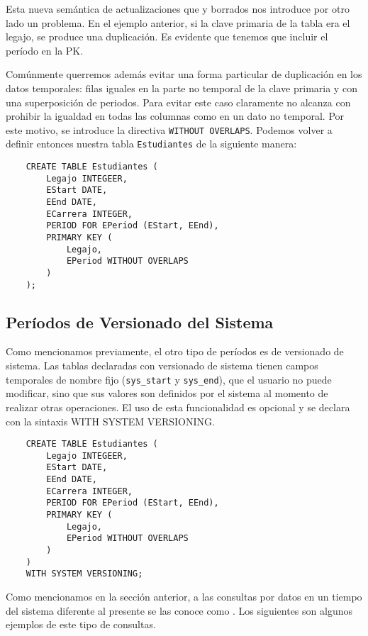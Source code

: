 Esta nueva semántica de actualizaciones que y borrados nos introduce por otro lado un problema.
En el ejemplo anterior, si la clave primaria de la tabla era el legajo, se produce una duplicación.
Es evidente que tenemos que incluir el período en la PK.

Comúnmente querremos además evitar una forma particular de duplicación en los datos temporales:
filas iguales en la parte no temporal de la clave primaria y con una superposición de periodos.
Para evitar este caso claramente no alcanza con prohibir la igualdad en todas las columnas como en un dato no temporal.
Por este motivo, se introduce la directiva \texttt{WITHOUT OVERLAPS}.
Podemos volver a definir entonces nuestra tabla \texttt{Estudiantes} de la siguiente manera:

\begin{verbatim}
    CREATE TABLE Estudiantes (
        Legajo INTEGEER,
        EStart DATE,
        EEnd DATE,
        ECarrera INTEGER,
        PERIOD FOR EPeriod (EStart, EEnd),
        PRIMARY KEY (
            Legajo,
            EPeriod WITHOUT OVERLAPS
        )
    );
\end{verbatim}



\subsection{Períodos de Versionado del Sistema} \label{subsec:pvs}

Como mencionamos previamente, el otro tipo de períodos es de versionado de sistema.
Las tablas declaradas con versionado de sistema tienen campos temporales de nombre fijo (\texttt{sys\_start} y \texttt{sys\_end}),
que el usuario no puede modificar, sino que sus valores son definidos por el sistema al momento de realizar otras operaciones.
El uso de esta funcionalidad es opcional y se declara con la sintaxis WITH SYSTEM VERSIONING.

\begin{verbatim}
    CREATE TABLE Estudiantes (
        Legajo INTEGEER,
        EStart DATE,
        EEnd DATE,
        ECarrera INTEGER,
        PERIOD FOR EPeriod (EStart, EEnd),
        PRIMARY KEY (
            Legajo,
            EPeriod WITHOUT OVERLAPS
        )
    )
    WITH SYSTEM VERSIONING;
\end{verbatim}

Como mencionamos en la sección anterior,
a las consultas por datos en un tiempo del sistema diferente al presente se las conoce como .
Los siguientes son algunos ejemplos de este tipo de consultas.

